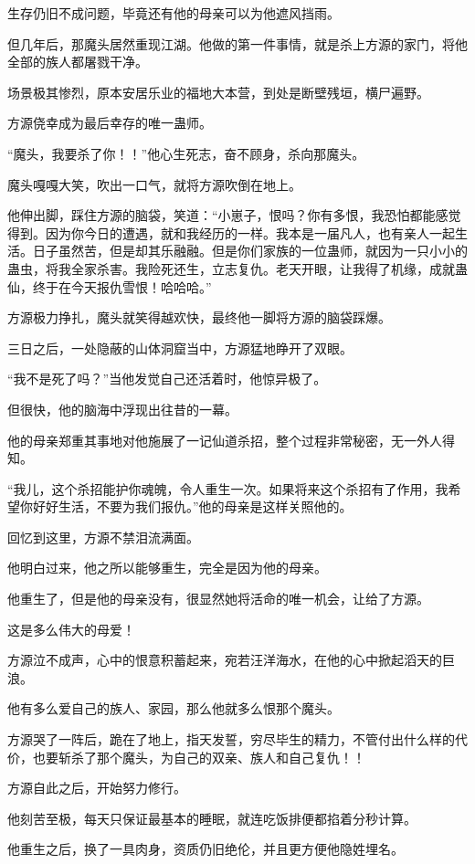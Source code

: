 \begin{this_body}
生存仍旧不成问题，毕竟还有他的母亲可以为他遮风挡雨。

但几年后，那魔头居然重现江湖。他做的第一件事情，就是杀上方源的家门，将他全部的族人都屠戮干净。

场景极其惨烈，原本安居乐业的福地大本营，到处是断壁残垣，横尸遍野。

方源侥幸成为最后幸存的唯一蛊师。

“魔头，我要杀了你！！”他心生死志，奋不顾身，杀向那魔头。

魔头嘎嘎大笑，吹出一口气，就将方源吹倒在地上。

他伸出脚，踩住方源的脑袋，笑道：“小崽子，恨吗？你有多恨，我恐怕都能感觉得到。因为你今日的遭遇，就和我经历的一样。我本是一届凡人，也有亲人一起生活。日子虽然苦，但是却其乐融融。但是你们家族的一位蛊师，就因为一只小小的蛊虫，将我全家杀害。我险死还生，立志复仇。老天开眼，让我得了机缘，成就蛊仙，终于在今天报仇雪恨！哈哈哈。”

方源极力挣扎，魔头就笑得越欢快，最终他一脚将方源的脑袋踩爆。

三日之后，一处隐蔽的山体洞窟当中，方源猛地睁开了双眼。

“我不是死了吗？”当他发觉自己还活着时，他惊异极了。

但很快，他的脑海中浮现出往昔的一幕。

他的母亲郑重其事地对他施展了一记仙道杀招，整个过程非常秘密，无一外人得知。

“我儿，这个杀招能护你魂魄，令人重生一次。如果将来这个杀招有了作用，我希望你好好生活，不要为我们报仇。”他的母亲是这样关照他的。

回忆到这里，方源不禁泪流满面。

他明白过来，他之所以能够重生，完全是因为他的母亲。

他重生了，但是他的母亲没有，很显然她将活命的唯一机会，让给了方源。

这是多么伟大的母爱！

方源泣不成声，心中的恨意积蓄起来，宛若汪洋海水，在他的心中掀起滔天的巨浪。

他有多么爱自己的族人、家园，那么他就多么恨那个魔头。

方源哭了一阵后，跪在了地上，指天发誓，穷尽毕生的精力，不管付出什么样的代价，也要斩杀了那个魔头，为自己的双亲、族人和自己复仇！！

方源自此之后，开始努力修行。

他刻苦至极，每天只保证最基本的睡眠，就连吃饭排便都掐着分秒计算。

他重生之后，换了一具肉身，资质仍旧绝伦，并且更方便他隐姓埋名。


\end{this_body}
